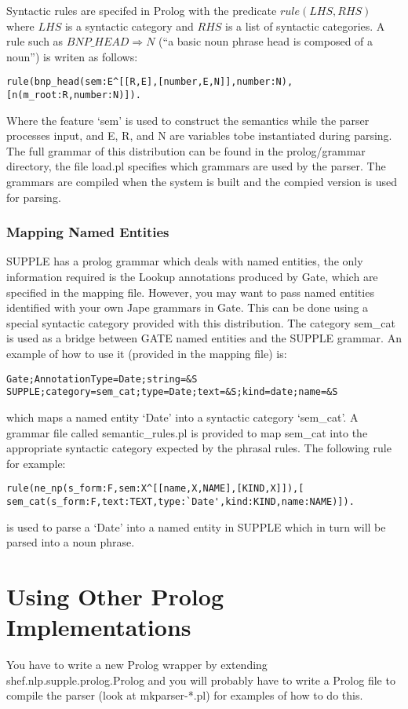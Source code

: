 \documentclass[a4paper,titlepage,openany,twoside]{book}
\begin{document}
Syntactic rules are specifed in Prolog with the predicate
$rule(LHS,RHS)$ where $LHS$ is a syntactic category and 
$RHS$ is a list of syntactic categories. A rule such as $BNP\_HEAD
\Rightarrow N$ (``a basic noun phrase head is composed of a noun'') is
writen as follows:

\begin{verbatim}
rule(bnp_head(sem:E^[[R,E],[number,E,N]],number:N), 
[n(m_root:R,number:N)]).
\end{verbatim}


Where the feature `sem' is used to construct the semantics while the
parser
processes input, and E, R, and N are variables tobe instantiated
during parsing.\\

The full grammar of this distribution can be found in the
prolog/grammar directory, the file load.pl specifies which grammars
are used by the parser. The grammars are compiled when the system is
built and the compied version is used for parsing.\\

\subsection{Mapping Named Entities}


SUPPLE has a prolog grammar which deals with named entities, the only
information required is the Lookup annotations
produced by Gate, which are specified in the mapping file.
 However, you may want to  pass named entities identified with your
own Jape grammars in 
Gate. This can be done using a special syntactic category provided 
with this distribution. The category
sem\_cat is used as a bridge between GATE named entities and the
SUPPLE grammar.
An example of how to use it (provided in the mapping file) is:

\begin{verbatim}
Gate;AnnotationType=Date;string=&S
SUPPLE;category=sem_cat;type=Date;text=&S;kind=date;name=&S
\end{verbatim}

which maps a named entity `Date' into a syntactic  category
`sem\_cat'.  A grammar file called semantic\_rules.pl is provided 
to map sem\_cat into the appropriate  syntactic category expected by
the phrasal rules. The following rule for example:

\begin{verbatim}
rule(ne_np(s_form:F,sem:X^[[name,X,NAME],[KIND,X]]),[
sem_cat(s_form:F,text:TEXT,type:`Date',kind:KIND,name:NAME)]).
\end{verbatim}


is used to parse a `Date' into a named entity in SUPPLE which in turn
will be parsed into a noun phrase.


\chapter{Using Other Prolog Implementations}
\label{chap:prolog}
You have to write a new Prolog wrapper by extending shef.nlp.supple.prolog.Prolog
and you will probably have to write a Prolog file to compile the parser (look at mkparser-*.pl)
for examples of how to do this.
\end{document}
